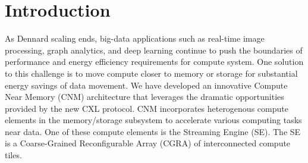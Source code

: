 \documentclass[sigplan,screen]{acmart}
\begin{document}



\maketitle

\section{Introduction}
As Dennard scaling ends, big-data applications such as real-time image processing, graph analytics, and deep learning continue to push the boundaries of performance and energy efficiency requirements for compute system. One solution to this challenge is to move compute closer to memory or storage for substantial energy savings of data movement. We have developed an innovative Compute Near Memory (CNM) architecture that leverages the dramatic opportunities provided by the new CXL protocol. CNM incorporates heterogenous compute elements in the memory/storage subsystem to accelerate various computing tasks near data. One of these compute elements is the Streaming Engine (SE). The SE is a Coarse-Grained Reconfigurable Array (CGRA) of interconnected compute tiles.  
\end{document}
